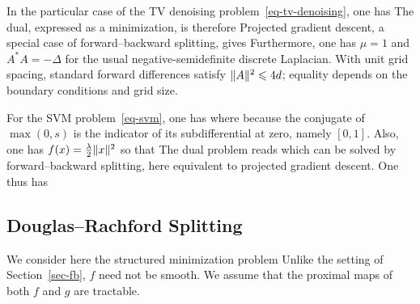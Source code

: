 \begin{exmp}[TV denoising]
In the particular case of the TV denoising problem~\eqref{eq-tv-denoising}, one has
The dual, expressed as a minimization, is therefore
Projected gradient descent, a special case of forward--backward splitting, gives
Furthermore, one has $\mu=1$ and $A^*A=-\Delta$ for the usual negative-semidefinite discrete Laplacian. With unit grid spacing, standard forward differences satisfy $\lVert A\rVert^2\leqslant4d$; equality depends on the boundary conditions and grid size.
\end{exmp}


\begin{exmp}
	For the SVM problem~\eqref{eq-svm}, one has 
	where 
	because the conjugate of $\max(0,s)$ is the indicator of its subdifferential at zero, namely $[0,1]$.
	Also, one has $f(x) = \frac{\lambda}{2}\lVert x\rVert^2$
	so that 
	The dual problem reads
	which can be solved by forward--backward splitting, here equivalent to projected gradient descent.
	One thus has 
\end{exmp}



\subsection{Douglas--Rachford Splitting}
\label{sec-dr}

We consider here the structured minimization problem
Unlike the setting of Section~\ref{sec-fb}, $f$ need not be smooth. We assume that the proximal maps of both $f$ and $g$ are tractable.

